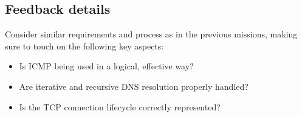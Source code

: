 \subsection*{Feedback details}

Consider similar requirements and process as in the previous missions, making sure to touch on the following key aspects:

\begin{itemize}
\item Is ICMP being used in a logical, effective way?
\item Are iterative and recursive DNS resolution properly handled?
\item Is the TCP connection lifecycle correctly represented?
\end{itemize}

